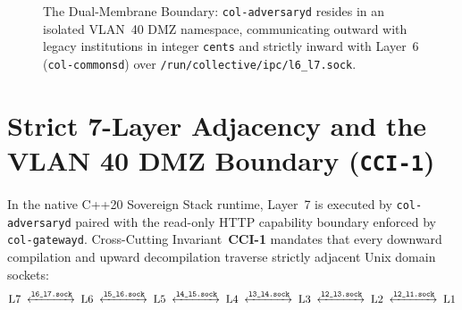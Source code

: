 \begin{figure}[htbp]
{%
}
\caption{The Dual-Membrane Boundary: \texttt{col-adversaryd} resides in an isolated VLAN~40 DMZ namespace, communicating outward with legacy institutions in integer \texttt{cents} and strictly inward with Layer~6 (\texttt{col-commonsd}) over \texttt{/run/collective/ipc/l6\_l7.sock}.}
\label{fig:ch1-dual-membrane}
\end{figure}

\section{Strict 7-Layer Adjacency and the VLAN 40 DMZ Boundary (\texttt{CCI-1})}
\label{sec:l7-daemon-isolation}

In the native C++20 Sovereign Stack runtime, Layer~7 is executed by \texttt{col-adversaryd} paired with the read-only HTTP capability boundary enforced by \texttt{col-gatewayd}. Cross-Cutting Invariant~\textbf{CCI-1} mandates that every downward compilation and upward decompilation traverse strictly adjacent Unix domain sockets:
\begin{equation}
\mathrm{L7}\;\xleftrightarrow{\texttt{l6\_l7.sock}}\;\mathrm{L6}\;\xleftrightarrow{\texttt{l5\_l6.sock}}\;\mathrm{L5}\;\xleftrightarrow{\texttt{l4\_l5.sock}}\;\mathrm{L4}\;\xleftrightarrow{\texttt{l3\_l4.sock}}\;\mathrm{L3}\;\xleftrightarrow{\texttt{l2\_l3.sock}}\;\mathrm{L2}\;\xleftrightarrow{\texttt{l2\_l1.sock}}\;\mathrm{L1}
\label{eq:ch1-strict-adjacency}
\end{equation}

